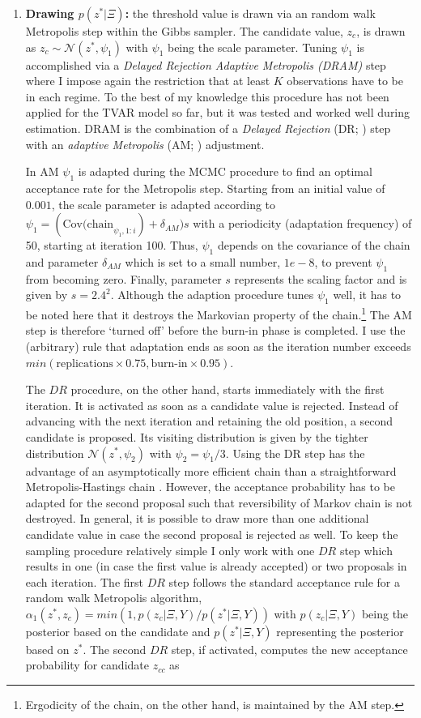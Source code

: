 \documentclass[12pt,letterpaper,fleqn]{article}           %
\begin{document}
\begin{enumerate}
\item \textbf{Drawing $p(z^*|\Xi)$:} the threshold value is drawn via an random walk Metropolis step within the Gibbs sampler. The candidate value, $z_{c}$, is drawn as $z_{c} \sim \mathcal{N}(z^*, \psi_1)$ with $\psi_1$ being the scale parameter. Tuning $\psi_1$ is accomplished via a \textit{Delayed Rejection Adaptive Metropolis (DRAM)} step \parencite{haario06} where I impose again the restriction that at least $K$ observations have to be in each regime. To the best of my knowledge this procedure has not been applied for the TVAR model so far, but it was tested and worked well during estimation.  DRAM is the combination of a \textit{Delayed Rejection} (DR; \cite{mira01}) step with an \textit{adaptive Metropolis} (AM; \cite{haario01}) adjustment. 

In AM $\psi_1$ is adapted during the MCMC procedure to find an optimal acceptance rate for the Metropolis step. Starting from an initial value of $0.001$, the scale parameter is adapted according to  $\psi_1 = (\mbox{Cov(chain}_{\psi_1,1:i}) + \delta_{AM})s$ with a periodicity (adaptation frequency) of 50, starting at iteration 100. Thus, $\psi_1$ depends on the covariance of the chain and parameter $\delta_{AM}$ which is set to a small number, $1e-8$, to prevent $\psi_1$ from becoming zero. Finally, parameter $s$ represents the scaling factor and is given by $s = 2.4^2$.%
 Although the adaption procedure tunes $\psi_1$ well, it has to be noted here that it destroys the Markovian property of the chain.\footnote{Ergodicity of the chain, on the other hand, is maintained by the AM step.} The AM step is therefore `turned off' before the burn-in phase is completed. I use the (arbitrary) rule that adaptation ends as soon as the iteration number exceeds $min(\mbox{replications} \times 0.75, \mbox{burn-in} \times 0.95)$. 

The $DR$ procedure, on the other hand, starts immediately with the first iteration. It is activated as soon as a candidate value is rejected. Instead of advancing with the next iteration and retaining the old position, a second candidate is proposed. Its visiting distribution is given by the tighter distribution $\mathcal{N}(z^*, \psi_2)$ with $\psi_2 = \psi_1 / 3$. Using the DR step has the advantage of an asymptotically more efficient chain than a straightforward Metropolis-Hastings chain \parencite{mira01}. However, the acceptance probability has to be adapted for the second proposal such that reversibility of Markov chain is not destroyed. In general, it is possible to draw more than one additional candidate value in case the second proposal is rejected as well. To keep the sampling procedure relatively simple I only work with one $DR$ step which results in one (in case the first value is already accepted) or two proposals in each iteration. The first $DR$ step follows the standard acceptance rule for a random walk Metropolis algorithm, $\alpha_1(z^*, z_c) = min(1, p(z_c|\Xi, Y) / p(z^*|\Xi,Y))$ with $p(z_c| \Xi, Y)$  being the posterior based on the candidate and  $p(z^*|\Xi,Y)$ representing the posterior based on $z^*$. The second $DR$ step, if activated, computes the new acceptance probability for candidate $z_{cc}$ as 


\end{enumerate}
\end{document}
